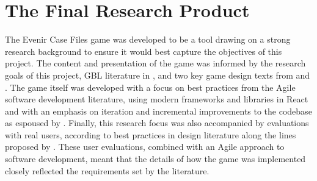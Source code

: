 \documentclass{l4proj}
\begin{document}
\section{The Final Research Product}

The Evenir Case Files game was developed to be a tool drawing on a strong research background to ensure it would best capture the objectives of this project. The content and presentation of the game was informed by the research goals of this project, GBL literature in \citet{malone1980makes}, and two key game design texts from \citet{fullerton2004game} and \citet{salen2004rules}. The game itself was developed with a focus on best practices from the Agile software development literature, using modern frameworks and libraries in React and with an emphasis on iteration and incremental improvements to the codebase as espoused by \citet{schwaber2002agile}. Finally, this research focus was also accompanied by evaluations with real users, according to best practices in design literature along the lines proposed by \citet{gulliksen2003key}. These user evaluations, combined with an Agile approach to software development, meant that the details of how the game was implemented closely reflected the requirements set by the literature. 
\end{document}
